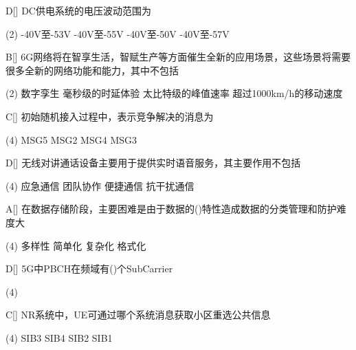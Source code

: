 \begin{choice}{D}[]
    DC供电系统的电压波动范围为
    \begin{tasks}(2)
        \task -40V至-53V
        \task -40V至-55V
        \task -40V至-50V
        \task -40V至-57V
    \end{tasks}
\end{choice}


\begin{choice}{B}[]
    6G网络将在智享生活，智赋生产等方面催生全新的应用场景，这些场景将需要很多全新的网络功能和能力，其中不包括
    \begin{tasks}(2)
        \task 数字孪生
        \task 毫秒级的时延体验
        \task 太比特级的峰值速率
        \task 超过1000km/h的移动速度
    \end{tasks}
\end{choice}


\begin{choice}{C}[]
    初始随机接入过程中，表示竞争解决的消息为
    \begin{tasks}(4)
        \task MSG5
        \task MSG2
        \task MSG4
        \task MSG3
    \end{tasks}
\end{choice}



\begin{choice}{D}[]
    无线对讲通话设备主要用于提供实时语音服务，其主要作用不包括
    \begin{tasks}(4)
        \task 应急通信
        \task 团队协作
        \task 便捷通信
        \task 抗干扰通信
    \end{tasks}
\end{choice}


\begin{choice}{A}[]
    在数据存储阶段，主要困难是由于数据的(\quad)特性造成数据的分类管理和防护难度大
    \begin{tasks}(4)
        \task 多样性
        \task 简单化
        \task 复杂化
        \task 格式化
    \end{tasks}
\end{choice}


\begin{choice}{D}[]
    5G中PBCH在频域有(\quad)个SubCarrier
    \begin{tasks}(4)
    \end{tasks}
\end{choice}


\begin{choice}{C}[]
    NR系统中，UE可通过哪个系统消息获取小区重选公共信息
    \begin{tasks}(4)
        \task SIB3
        \task SIB4
        \task SIB2
        \task SIB1
    \end{tasks}
\end{choice}


